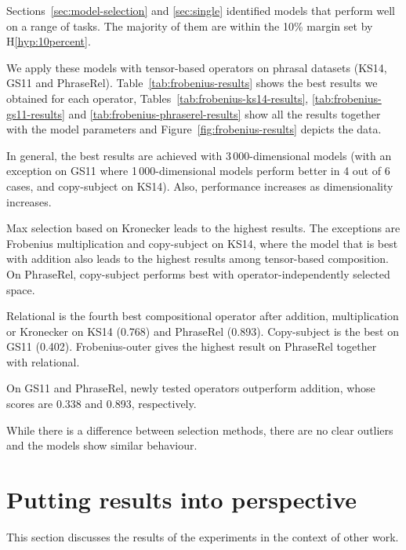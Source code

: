 Sections~\ref{sec:model-selection} and \ref{sec:single} identified models that perform well on a range of tasks. The majority of them are within the 10\% margin set by H\ref{hyp:10percent}.



We apply these models with tensor-based operators on phrasal datasets (KS14, GS11 and PhraseRel). Table~\ref{tab:frobenius-results} shows the best results we obtained for each operator, Tables~\ref{tab:frobenius-ks14-results}, \ref{tab:frobenius-gs11-results} and \ref{tab:frobenius-phraserel-results} show all the results together with the model parameters and Figure~\ref{fig:frobenius-results} depicts the data.

In general, the best results are achieved with 3\,000-dimensional models (with an exception on GS11 where 1\,000-dimensional models perform better in 4 out of 6 cases, and copy-subject on KS14). Also, performance increases as dimensionality increases.

Max selection based on Kronecker leads to the highest results. The exceptions are Frobenius multiplication and copy-subject on KS14, where the model that is best with addition also leads to the highest results among tensor-based composition. On PhraseRel, copy-subject performs best with operator-independently selected space.

Relational is the fourth best compositional operator after addition, multiplication or Kronecker on KS14 (0.768) and PhraseRel (0.893). Copy-subject is the best on GS11 (0.402). Frobenius-outer gives the highest result on PhraseRel together with relational.

On GS11 and PhraseRel, newly tested operators outperform addition, whose scores are 0.338 and 0.893, respectively.

While there is a difference between selection methods, there are no clear outliers and the models show similar behaviour.

\section{Putting results into perspective}
\label{sec:comp-with-other}

This section discusses the results of the experiments in the context of other work.

